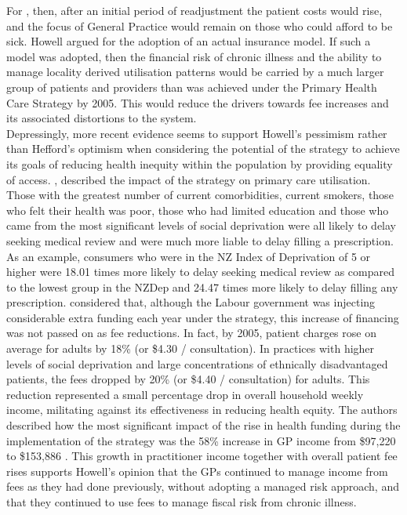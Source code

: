 \documentclass[11pt,a4paper]{article}
\begin{document}
For \citet{howell2005restructuring}, then, after an initial period of readjustment the patient costs would rise, and the focus of General Practice would remain on those who could afford to be sick. Howell argued for the adoption of an actual insurance model. If such a model was adopted, then the financial risk of chronic illness and the ability to manage locality derived utilisation patterns would be carried by a much larger group of patients and providers than was achieved under the Primary Health Care Strategy by 2005. This would reduce the drivers towards fee increases and its associated distortions to the system.\\


Depressingly, more recent evidence seems to support Howell's pessimism rather than Hefford's optimism when considering the potential of the strategy to achieve its goals of reducing health inequity within the population by providing equality of access. \citet{jatrana2009primary}, described the impact of the strategy on primary care utilisation. Those with the greatest number of current comorbidities, current smokers, those who felt their health was poor, those who had limited education and those who came from the most significant levels of social deprivation were all likely to delay seeking medical review and were much more liable to delay filling a prescription.  As an example, consumers who were in the NZ Index of Deprivation of 5 or higher were 18.01 times more likely to delay seeking medical review as compared to the lowest group in the NZDep and 24.47 times more likely to delay filling any prescription. \citet{cumming2008reforming} considered  that, although the Labour government was injecting considerable extra funding each year under the strategy, this increase of financing was not passed on as fee reductions.  In fact, by 2005, patient charges rose on average for adults by 18\% (or \$4.30 / consultation). In practices with higher levels of social deprivation and large concentrations of ethnically disadvantaged patients, the fees dropped by 20\% (or \$4.40 / consultation) for adults. This reduction represented a small percentage drop in overall household weekly income, militating against its effectiveness in reducing health equity.  The authors described how the most significant impact of the rise in health funding during the implementation of the strategy was the 58\% increase in GP income from \$97,220 to \$153,886 \citep{cumming2008reforming}. This growth in practitioner income together with overall patient fee rises supports Howell's opinion that the GPs continued to manage income from fees as they had done previously, without adopting a managed risk approach, and that they continued to use fees to manage fiscal risk from chronic illness. \\
\end{document}
